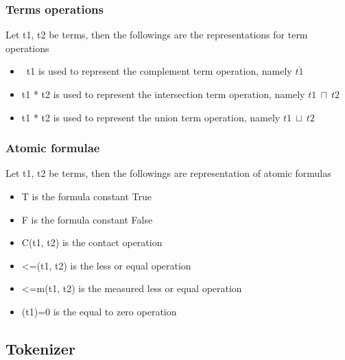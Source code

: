 \documentclass{article}
\begin{document}
		\subsubsection*{Terms operations}
		Let t1, t2 be terms, then the followings are the representations for term operations
		\begin{itemize}
			\item ~t1 is used to represent the complement term operation, namely $\bar{t1}$
			\item t1 * t2 is used to represent the intersection term operation, namely $t1 \: \sqcap \: t2$
			\item t1 * t2 is used to represent the union term operation, namely $t1 \: \sqcup \: t2$
		\end{itemize}
		
		\subsubsection*{Atomic formulae}
		Let t1, t2 be terms, then the followings are representation of atomic formulas
		\begin{itemize}
			\item T is the formula constant True
			\item F is the formula constant False
			\item C(t1, t2) is the contact operation
			\item <=(t1, t2) is the less or equal operation
			\item <=m(t1, t2) is the measured less or equal operation
			\item (t1)=0 is the equal to zero operation
		\end{itemize}

	\subsection{Tokenizer}
\end{document}
